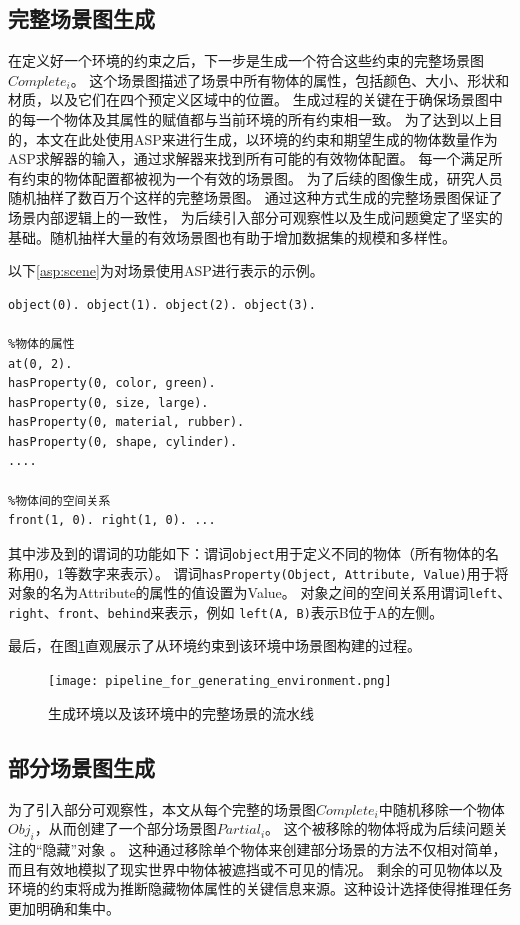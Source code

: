 \subsection{完整场景图生成}
在定义好一个环境的约束之后，下一步是生成一个符合这些约束的完整场景图$Complete_i$。
这个场景图描述了场景中所有物体的属性，包括颜色、大小、形状和材质，以及它们在四个预定义区域中的位置。
生成过程的关键在于确保场景图中的每一个物体及其属性的赋值都与当前环境的所有约束相一致。
为了达到以上目的，本文在此处使用ASP来进行生成，以环境的约束和期望生成的物体数量作为ASP求解器的输入，通过求解器来找到所有可能的有效物体配置。
每一个满足所有约束的物体配置都被视为一个有效的场景图。
为了后续的图像生成，研究人员随机抽样了数百万个这样的完整场景图。
通过这种方式生成的完整场景图保证了场景内部逻辑上的一致性，
为后续引入部分可观察性以及生成问题奠定了坚实的基础。随机抽样大量的有效场景图也有助于增加数据集的规模和多样性。   

以下\ref{asp:scene}为对场景使用ASP进行表示的示例。
\begin{lstlisting}[label=asp:scene]
%场景中的物体
object(0). object(1). object(2). object(3).

%物体的属性
at(0, 2).
hasProperty(0, color, green).
hasProperty(0, size, large).
hasProperty(0, material, rubber).
hasProperty(0, shape, cylinder).
....

%物体间的空间关系
front(1, 0). right(1, 0). ...
\end{lstlisting}

其中涉及到的谓词的功能如下：谓词\texttt{object}用于定义不同的物体（所有物体的名称用0，1等数字来表示）。
谓词\texttt{hasProperty(Object, Attribute, Value)}用于将对象的名为Attribute的属性的值设置为Value。
对象之间的空间关系用谓词\texttt{left}、\texttt{right}、\texttt{front}、\texttt{behind}来表示，例如
\texttt{left(A, B)}表示B位于A的左侧。

最后，在图\ref{pipeline_for_generating_environment}直观展示了从环境约束到该环境中场景图构建的过程。
\begin{figure}
    \centering
    \texttt{[image: pipeline\_for\_generating\_environment.png]}
    \caption{生成环境以及该环境中的完整场景的流水线}
    \label{pipeline_for_generating_environment}
\end{figure}
\subsection{部分场景图生成}
为了引入部分可观察性，本文从每个完整的场景图$Complete_i$中随机移除一个物体$Obj_i$，从而创建了一个部分场景图$Partial_i$。
这个被移除的物体将成为后续问题关注的“隐藏”对象 。
这种通过移除单个物体来创建部分场景的方法不仅相对简单，而且有效地模拟了现实世界中物体被遮挡或不可见的情况。
剩余的可见物体以及环境的约束将成为推断隐藏物体属性的关键信息来源。这种设计选择使得推理任务更加明确和集中。
